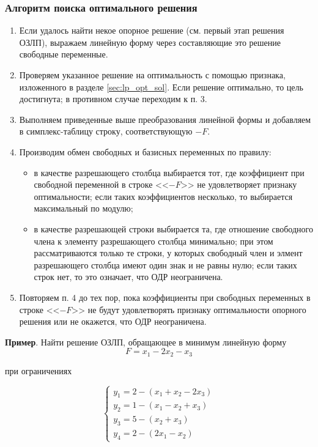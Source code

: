\documentclass[a4paper,12pt]{report}
\begin{document}
\subsubsection{Алгоритм поиска оптимального решения}
\begin{enumerate}
\item Если удалось найти некое опорное решение (см. первый этап решения ОЗЛП), выражаем линейную форму через составляющие это решение свободные переменные.
\item Проверяем указанное решение на оптимальность с помощью признака, изложенного в разделе \ref{sec:lp_opt_sol}. Если решение оптимально, то цель достигнута; в противном случае переходим к п. 3.
\item Выполняем приведенные выше преобразования линейной формы и добавляем в симплекс-таблицу строку, соответствующую $-F$.
\item Производим обмен свободных и базисных переменных по правилу:
\begin{itemize}
\item в качестве разрешающего столбца выбирается тот, где коэффициент при свободной переменной в строке <<$-F$>> не удовлетворяет признаку оптимальности; если таких коэффициентов несколько, то выбирается максимальный по модулю;
\item в качестве разрешающей строки выбирается та, где отношение свободного члена к элементу разрешающего столбца минимально; при этом рассматриваются только те строки, у которых свободный член и элмент разрешающего столбца имеют один знак и не равны нулю; если таких строк нет, то это означает, что ОДР неограничена.
\end{itemize}
\item Повторяем п. 4 до тех пор, пока коэффициенты при свободных переменных в строке <<$-F$>> не будут удовлетворять признаку оптимальности опорного решения или не окажется, что ОДР неограничена.
\end{enumerate}

\textbf{Пример}. Найти решение ОЗЛП, обращающее в минимум линейную форму
\begin{equation*}
F = x_{1} - 2x_{2} - x_{3}
\end{equation*}

при ограничениях

\begin{equation*}
\begin{cases}
y_{1} = 2 - (x_{1} + x_{2} - 2x_{3})\\
y_{2} = 1 - (x_{1} - x_{2} + x_{3})\\
y_{3} = 5 - (x_{2} + x_{3})\\
y_{4} = 2 - (2x_{1} - x_{2})
\end{cases}	
\end{equation*}
\end{document}
